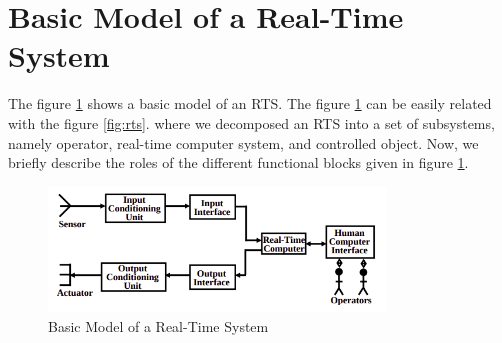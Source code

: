 \documentclass[12pt]{report}
\begin{document}
\section{Basic Model of a Real-Time System}
The figure \ref{fig:model} shows a basic model of an RTS. The figure \ref{fig:model} can be easily related with the figure \ref{fig:rts}. where we decomposed an RTS into a set of subsystems, namely operator, real-time computer system, and controlled object.  Now, we
briefly describe the roles of the different functional blocks given in figure \ref{fig:model}. 
\begin{figure}[h]
    \centering
    \includegraphics[width=0.8\textwidth]{images/model-rts.png}
    \caption[Basic Model of a Real-Time System]{Basic Model of a Real-Time System \cite{NPTEL}}
    \label{fig:model}
\end{figure}
\end{document}
